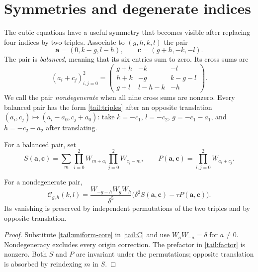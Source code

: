 \section{Symmetries and degenerate indices}
\label{sec:degenerate}

The cubic equations have a useful symmetry that becomes visible after
replacing four indices by two triples. Associate to $(g,h,k,l)$ the pair
\begin{equation}\label{tail:triples}
 \boldsymbol a=(0,k-g,l-h),\qquad
 \boldsymbol c=(g+h,-k,-l).
\end{equation}
The pair is \emph{balanced}, meaning that its six entries sum to zero.
Its cross sums are
\begin{equation}\label{tail:crossmatrix}
 (a_i+c_j)_{i,j=0}^2=
 \begin{pmatrix}
 g+h&-k&-l\\
 h+k&-g&k-g-l\\
 g+l&l-h-k&-h
 \end{pmatrix}.
\end{equation}
We call the pair \emph{nondegenerate} when all nine cross sums are nonzero.
Every balanced pair has the form \eqref{tail:triples} after an opposite
translation $(a_i,c_j)\mapsto(a_i-a_0,c_j+a_0)$: take
$k=-c_1$, $l=-c_2$, $g=-c_1-a_1$, and $h=-c_2-a_2$ after translating.

For a balanced pair, set
\[
 S(\boldsymbol a,\boldsymbol c)
 =\sum_m\prod_{i=0}^2W_{m+a_i}\prod_{j=0}^2W_{c_j-m},
 \qquad
 P(\boldsymbol a,\boldsymbol c)=\prod_{i,j=0}^2W_{a_i+c_j}.
\]

\begin{lemma}\label{tail:factor-lemma}
For a nondegenerate pair,
\begin{equation}\label{tail:factor}
 \mathcal C_{g,h}(k,l)
 =\frac{W_{-g-h}W_gW_h}{\delta^5}
       \bigl(\delta^2S(\boldsymbol a,\boldsymbol c)
                      -\tau P(\boldsymbol a,\boldsymbol c)\bigr).
\end{equation}
Its vanishing is preserved by independent permutations of the two
triples and by opposite translation.
\end{lemma}

\begin{proof}
Substitute \eqref{tail:uniform-core} in \eqref{tail:C} and use
$W_aW_{-a}=\delta$ for $a\ne0$. Nondegeneracy excludes every origin
correction. The prefactor in \eqref{tail:factor} is nonzero.
Both $S$ and $P$ are invariant under the permutations; opposite
translation is absorbed by reindexing $m$ in $S$.
\end{proof}

